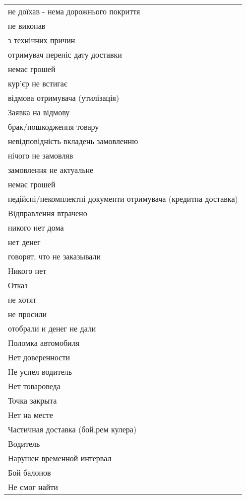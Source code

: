 \begin{longtable}[c]{ | p{16cm} | }
	\nopagebreak\quad не доїхав - нема дорожнього покриття \\
	\nopagebreak\quad не виконав \\
	\nopagebreak\quad з технічних причин \\
	\nopagebreak\quad отримувач переніс дату доставки \\
	\nopagebreak\quad немає грошей \\
	\nopagebreak\quad кур’єр не встигає \\
	\nopagebreak\quad відмова отримувача (утилізація) \\
	\hline
	Заявка на відмову \\
	\nopagebreak\quad брак/пошкодження товару \\
	\nopagebreak\quad невідповідність вкладень замовленню \\
	\nopagebreak\quad нічого не замовляв \\
	\nopagebreak\quad замовлення не актуальне \\
	\nopagebreak\quad немає грошей \\
	\nopagebreak\quad недійсні/некомплектні документи отримувача (кредитна доставка) \\
	\hline
	Відправлення втрачено \\
	\hline
	никого нет дома \\
	\hline
	нет денег \\
	\hline
	говорят, что не заказывали \\
	\hline
	Никого нет \\
	\hline
	Отказ \\
	\hline
	не хотят \\
	\hline
	не просили \\
	\hline
	отобрали и денег не дали \\
	\hline
	Поломка автомобиля \\
	\hline
	Нет доверенности \\
	\hline
	Не успел водитель \\
	\hline
	Нет товароведа \\
	\hline
	Точка закрыта \\
	\hline
	Нет на месте \\
	\hline
	Частичная доставка (бой,рем кулера) \\
	\hline
	Водитель \\
	\nopagebreak\quad Нарушен временной интервал \\
	\nopagebreak\quad Бой балонов \\
	\nopagebreak\quad Не смог найти \\

\end{longtable}
